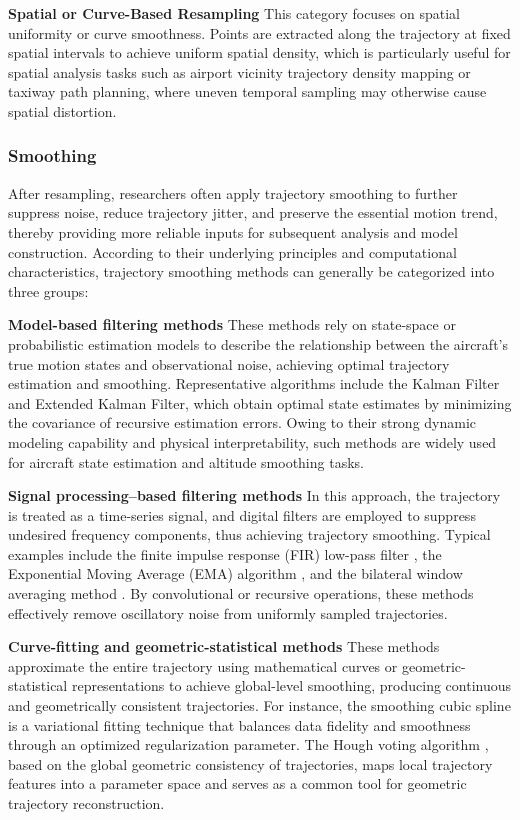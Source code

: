 \textbf{Spatial or Curve-Based Resampling}
This category focuses on spatial uniformity or curve smoothness.
Points are extracted along the trajectory at fixed spatial intervals to achieve uniform spatial density, which is particularly useful for spatial analysis tasks such as airport vicinity trajectory density mapping or taxiway path planning, where uneven temporal sampling may otherwise cause spatial distortion.

\subsubsection{Smoothing}
After resampling, researchers often apply trajectory smoothing to further suppress noise, reduce trajectory jitter, and preserve the essential motion trend, thereby providing more reliable inputs for subsequent analysis and model construction.
According to their underlying principles and computational characteristics, trajectory smoothing methods can generally be categorized into three groups:

\textbf{Model-based filtering methods}
These methods rely on state-space or probabilistic estimation models to describe the relationship between the aircraft’s true motion states and observational noise, achieving optimal trajectory estimation and smoothing.
Representative algorithms include the Kalman Filter \cite{LU2021102970} and Extended Kalman Filter, which obtain optimal state estimates by minimizing the covariance of recursive estimation errors. Owing to their strong dynamic modeling capability and physical interpretability, such methods are widely used for aircraft state estimation and altitude smoothing tasks.

\textbf{Signal processing–based filtering methods}
In this approach, the trajectory is treated as a time-series signal, and digital filters are employed to suppress undesired frequency components, thus achieving trajectory smoothing.
Typical examples include the finite impulse response (FIR) low-pass filter \cite{churchill2019clustering}, the Exponential Moving Average (EMA) algorithm \cite{ZHU2023102473} , and the bilateral window averaging method \cite{7549107}. By convolutional or recursive operations, these methods effectively remove oscillatory noise from uniformly sampled trajectories.

\textbf{Curve-fitting and geometric-statistical methods}
These methods approximate the entire trajectory using mathematical curves or geometric-statistical representations to achieve global-level smoothing, producing continuous and geometrically consistent trajectories.
For instance, the smoothing cubic spline \cite{alligier2018learning} is a variational fitting technique that balances data fidelity and smoothness through an optimized regularization parameter. The Hough voting algorithm \cite{LIU2024104652}, based on the global geometric consistency of trajectories, maps local trajectory features into a parameter space and serves as a common tool for geometric trajectory reconstruction.

